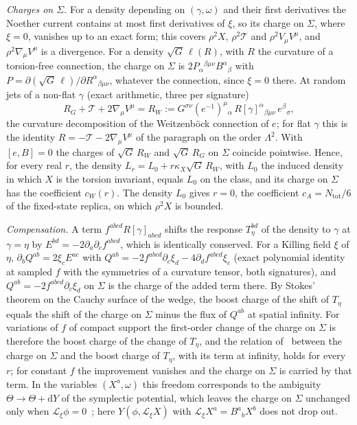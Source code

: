 \emph{Charges on \(\Sigma\).} For a density depending on \((\gamma,\omega)\) and their first derivatives the Noether current contains at most first derivatives of \(\xi\), so its charge on \(\Sigma\), where \(\xi=0\), vanishes up to an exact form; this covers \(\rho^2X\), \(\rho^2\mathcal T\) and \(\rho^2V_\mu V^\mu\), and \(\rho^2\nabla_\mu V^\mu\) is a divergence. For a density \(\sqrt G\,\ell(R)\), with \(R\) the curvature of a torsion-free connection, the charge on \(\Sigma\) is \(2P_\alpha{}^{\beta\mu\nu}B^\alpha{}_\beta\) with \(P=\partial(\sqrt G\,\ell)/\partial R^\alpha{}_{\beta\mu\nu}\), whatever the connection, since \(\xi=0\) there. At random jets of a non-flat \(\gamma\) (exact arithmetic, three per signature)
\[
  R_G+\mathcal T+2\nabla_\mu V^\mu=R_W:=G^{\sigma\nu}(e^{-1})^\mu{}_\alpha\,R[\gamma]^\alpha{}_{\beta\mu\nu}\,e^\beta{}_\sigma ,
\]
the curvature decomposition of the Weitzenb\"ock connection of \(e\); for flat \(\gamma\) this is the identity \(R=-\mathcal T-2\nabla_\mu V^\mu\) of the paragraph on the order \(\Lambda^2\). With \([e,B]=0\) the charges of \(\sqrt G\,R_W\) and \(\sqrt G\,R_G\) on \(\Sigma\) coincide pointwise. Hence, for every real \(r\), the density \(L_r=L_0+r\kappa_X\sqrt G\,R_W\), with \(L_0\) the induced density in which \(X\) is the torsion invariant, equals \(L_0\) on the class, and its charge on \(\Sigma\) has the coefficient \(c_W(r)\). The density \(L_0\) gives \(r=0\), the coefficient \(c_A=N_{\mathrm{tot}}/6\) of the fixed-state replica, on which \(\rho^2X\) is bounded.

\emph{Compensation.} A term \(f^{abcd}R[\gamma]_{abcd}\) shifts the response \(T_\eta^{bd}\) of the density to \(\gamma\) at \(\gamma=\eta\) by \(E^{bd}=-2\partial_a\partial_cf^{abcd}\), which is identically conserved. For a Killing field \(\xi\) of \(\eta\), \(\partial_bQ^{ab}=2\xi_cE^{ac}\) with \(Q^{ab}=-2f^{abcd}\partial_c\xi_d-4\partial_df^{abcd}\xi_c\) (exact polynomial identity at sampled \(f\) with the symmetries of a curvature tensor, both signatures), and \(Q^{ab}=-2f^{abcd}\partial_c\xi_d\) on \(\Sigma\) is the charge of the added term there. By Stokes' theorem on the Cauchy surface of the wedge, the boost charge of the shift of \(T_\eta\) equals the shift of the charge on \(\Sigma\) minus the flux of \(Q^{ab}\) at spatial infinity. For variations of \(f\) of compact support the first-order change of the charge on \(\Sigma\) is therefore the boost charge of the change of \(T_\eta\), and the relation of~\cite{IyerWald1994} between the charge on \(\Sigma\) and the boost charge of \(T_\eta\), with its term at infinity, holds for every \(r\); for constant \(f\) the improvement vanishes and the charge on \(\Sigma\) is carried by that term. In the variables \((X^a,\omega)\) this freedom corresponds to the ambiguity \(\Theta\to\Theta+\mathrm dY\) of the symplectic potential, which leaves the charge on \(\Sigma\) unchanged only when \(\mathcal L_\xi\phi=0\)~\cite{JacobsonKangMyers1994}; here \(Y(\phi,\mathcal L_\xi X)\) with \(\mathcal L_\xi X^a=B^a{}_bX^b\) does not drop out.

